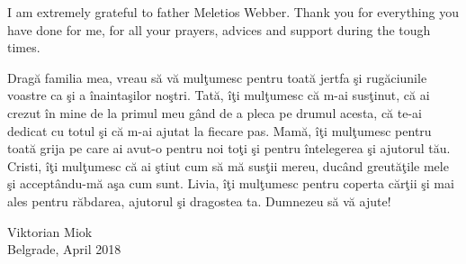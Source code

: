 \begin{acknowledgements}
I am extremely grateful to father Meletios Webber. Thank you for everything you have done for me, for all your prayers, advices and support during the tough times.
				

Drag\u{a} familia mea, vreau s\u{a} v\u{a} mul\c{t}umesc pentru toat\u{a} jertfa \c{s}i rug\u{a}ciunile voastre ca \c{s}i a \^{i}nainta\c{s}ilor no\c{s}tri. Tat\u{a}, \^{i}\c{t}i mul\c{t}umesc c\u{a} m-ai sus\c{t}inut, c\u{a} ai crezut \^{i}n mine de la primul meu g\^{a}nd de a pleca pe drumul acesta, c\u{a} te-ai dedicat cu totul \c{s}i c\u{a} m-ai ajutat la fiecare pas. Mam\u{a}, \^{i}\c{t}i mul\c{t}umesc pentru toat\u{a} grija pe care ai avut-o pentru noi to\c{t}i \c{s}i pentru \^{i}ntelegerea \c{s}i ajutorul t\u{a}u. Cristi, \^{i}\c{t}i mul\c{t}umesc c\u{a} ai \c{s}tiut cum s\u{a} m\u{a} sus\c{t}ii mereu, duc\^{a}nd greut\u{a}\c{t}ile mele \c{s}i accept\^{a}ndu-m\u{a} a\c{s}a cum sunt. Livia, \^{i}\c{t}i mul\c{t}umesc pentru coperta c\u{a}r\c{t}ii \c{s}i mai ales pentru r\u{a}bdarea, ajutorul \c{s}i dragostea ta. Dumnezeu s\u{a} v\u{a} ajute!
\par \begin{flushright} Viktorian Miok\\
Belgrade, April 2018 \end{flushright}
\end{acknowledgements}
